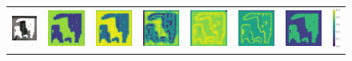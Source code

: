 \documentclass[10pt,journal,compsoc]{IEEEtran}
\begin{document}
\begin{figure}[hbt]
	\small
	\setlength{\tabcolsep}{2.0pt}
	\centering
	\begin{tabular}{cccccccc}
		\includegraphics[width=.130\textwidth]{Ablation/mask-updating/input18-0.png}  &
		\includegraphics[width=.130\textwidth]{Ablation/mask-updating/forwardmap1.png}  &
		\includegraphics[width=.130\textwidth]{Ablation/mask-updating/forwardmap2.png}  &
		\includegraphics[width=.130\textwidth]{Ablation/mask-updating/forwardmap3.png}  &
		\includegraphics[width=.130\textwidth]{Ablation/mask-updating/reversemap3.png}  &
		\includegraphics[width=.130\textwidth]{Ablation/mask-updating/reversemap2.png}  &
		\includegraphics[width=.130\textwidth]{Ablation/mask-updating/reversemap1.png} &
		\includegraphics[height=.130\textwidth]{paris/colorbar}\\

\end{tabular}
\end{figure}
\end{document}
